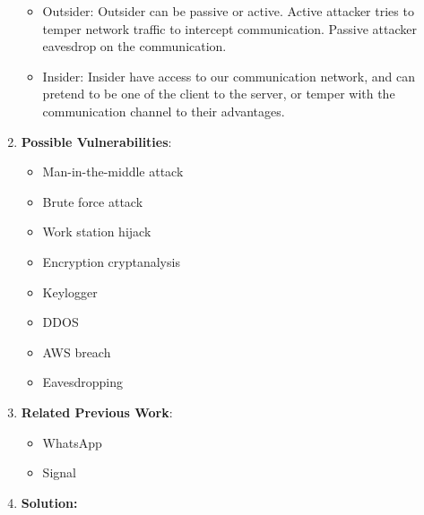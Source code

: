 \documentclass{article}
\begin{document}
\begin{enumerate}
\begin {itemize}
		    \item Outsider: Outsider can be passive or active. Active attacker tries to temper
             network traffic to intercept communication. Passive attacker eavesdrop on the 
             communication.
				
		    \item Insider: Insider have access to our communication network, and can pretend to be
             one of the client to the server, or temper with the communication channel to their 
             advantages.				
        \end {itemize}
    \item \textbf {Possible Vulnerabilities}:
    	\begin {itemize}
        	\item Man-in-the-middle attack
			\item Brute force attack
			\item Work station hijack
			\item Encryption cryptanalysis
			\item Keylogger
			\item DDOS
			\item AWS breach
			\item Eavesdropping
			
        \end {itemize}
    \item \textbf {Related Previous Work}:
        \begin {itemize}
            \item WhatsApp
            \item Signal
        \end {itemize}
    \item \textbf {Solution:} 
\begin{itemize}


\end{itemize}
\end{enumerate}
\end{document}
